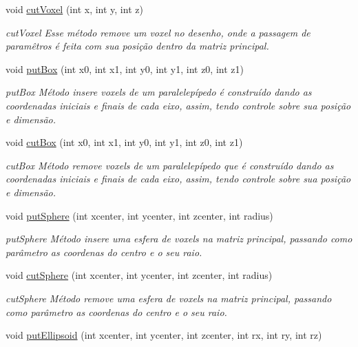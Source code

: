 \begin{DoxyCompactItemize}
void \mbox{\hyperlink{classsculptor3d_a3bc32c45bd4de88a0316e709e63fb54f}{cut\+Voxel}} (int x, int y, int z)
\begin{DoxyCompactList}\small\item\em cut\+Voxel Esse método remove um voxel no desenho, onde a passagem de paramêtros é feita com sua posição dentro da matriz principal. \end{DoxyCompactList}\item 
void \mbox{\hyperlink{classsculptor3d_a33ad346684939cacea6c469afad99ffd}{put\+Box}} (int x0, int x1, int y0, int y1, int z0, int z1)
\begin{DoxyCompactList}\small\item\em put\+Box Método insere voxels de um paralelepípedo é construído dando as coordenadas iniciais e finais de cada eixo, assim, tendo controle sobre sua posição e dimensão. \end{DoxyCompactList}\item 
void \mbox{\hyperlink{classsculptor3d_ac92f60c7e3fd6ec3df820ddd118d7918}{cut\+Box}} (int x0, int x1, int y0, int y1, int z0, int z1)
\begin{DoxyCompactList}\small\item\em cut\+Box Método remove voxels de um paralelepípedo que é construído dando as coordenadas iniciais e finais de cada eixo, assim, tendo controle sobre sua posição e dimensão. \end{DoxyCompactList}\item 
void \mbox{\hyperlink{classsculptor3d_a81b399736b253ef298e7cf04feed9607}{put\+Sphere}} (int xcenter, int ycenter, int zcenter, int radius)
\begin{DoxyCompactList}\small\item\em put\+Sphere Método insere uma esfera de voxels na matriz principal, passando como parâmetro as coordenas do centro e o seu raio. \end{DoxyCompactList}\item 
void \mbox{\hyperlink{classsculptor3d_a1e8bf7a173f21c6fd805291ae76e94e8}{cut\+Sphere}} (int xcenter, int ycenter, int zcenter, int radius)
\begin{DoxyCompactList}\small\item\em cut\+Sphere Método remove uma esfera de voxels na matriz principal, passando como parâmetro as coordenas do centro e o seu raio. \end{DoxyCompactList}\item 
void \mbox{\hyperlink{classsculptor3d_a0dbd7e2f4ad70f379a38678df1fe7583}{put\+Ellipsoid}} (int xcenter, int ycenter, int zcenter, int rx, int ry, int rz)

\end{DoxyCompactItemize}
